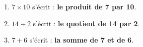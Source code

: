 \begin{Correction}
\begin{EXO}{}{}

\begin{enumerate}[itemsep=1em]
\item $7 \times 10$ s'écrit : {\bfseries \color[HTML]{f15929}le produit de 7 par 10}.
\item $14 \div 2$ s'écrit : {\bfseries \color[HTML]{f15929}le quotient de 14 par 2}.
\item $7+6$ s'écrit : {\bfseries \color[HTML]{f15929}la somme de 7 et de 6}.
\end{enumerate}

\end{EXO}

\clearpage
\end{Correction}


